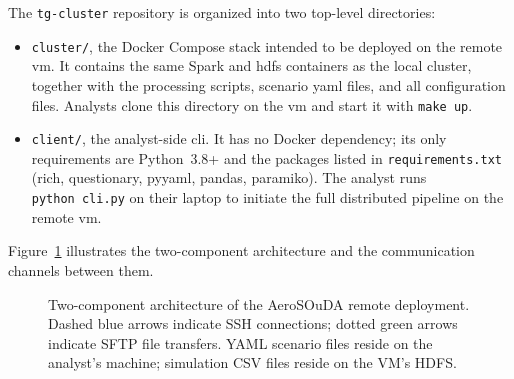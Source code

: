 The \texttt{tg-cluster} repository is organized into two top-level directories:

\begin{itemize}
  \item \texttt{cluster/}, the Docker Compose stack intended to be deployed on the remote
        \gls{vm}.  It contains the same Spark and \gls{hdfs} containers as the local cluster,
        together with the processing scripts, scenario \gls{yaml} files, and all configuration
        files.  Analysts clone this directory on the \gls{vm} and start it with
        \texttt{make~up}.
  \item \texttt{client/}, the analyst-side \gls{cli}.  It has no Docker dependency; its only
        requirements are Python~3.8+ and the packages listed in \texttt{requirements.txt} (rich,
        questionary, pyyaml, pandas, paramiko).  The analyst runs \texttt{python~cli.py} on their
        laptop to initiate the full distributed pipeline on the remote \gls{vm}.
\end{itemize}

Figure~\ref{fig:rm-arch} illustrates the two-component architecture and the communication
channels between them.

\begin{figure}[htbp]
\centering
{}
\caption[Two-component architecture of the AeroSOuDA remote deployment.]{Two-component architecture of the AeroSOuDA remote deployment.
         Dashed blue arrows indicate SSH connections; dotted green arrows indicate SFTP
         file transfers.  YAML scenario files reside on the analyst's machine; simulation
         CSV files reside on the VM's HDFS.}
\label{fig:rm-arch}
\end{figure}

